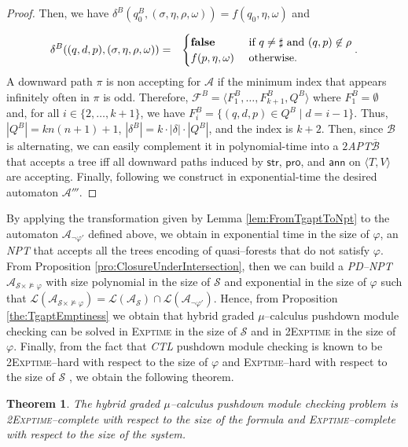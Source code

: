 \documentclass{LMCS}
\theoremstyle{plain}
\def \A             {\mathcal{A}}
\def \ann           {\ensuremath{\mathsf{ann}}\xspace}
\def \B             {\mathcal{B}}
\def \CTL           {\emph{CTL}\xspace}
\def \EXPTIME       {\textsc{Exptime}\xspace}
\def \F             {\mathcal{F}}
\def \L             {\mathcal{L}}
\def \NPT           {\emph{NPT}\xspace}
\def \PDNPT         {\emph{PD--NPT}\xspace}
\def \prom          {\ensuremath{\mathsf{pro}}\xspace}
\def \S             {\mathcal{S}}
\def \strat         {\ensuremath{\mathsf{str}}\xspace}
\def \TAPT          {\emph{$2$APT}\xspace}
\def \TWOEXPTIME    {\textsc{2Exptime}\xspace}
\newcommand \tpl[1] {\langle #1 \rangle}
\newtheorem{theorem}{Theorem}
\begin{document}
\begin{proof}
Then, we have $\delta^B(q_0^B, (\sigma, \eta, \rho, \omega)) =
f(q_0, \eta, \omega)$ and

{\small
\begin{eqnarray*}
    \delta^B((q, d, p), (\sigma, \eta, \rho, \omega)) &=& \begin{cases}
        {\bf false} & \mbox{ if } q \neq \sharp \mbox{ and } (q, p) \not\in \rho \\
        f(p, \eta, \omega) & \mbox{ otherwise.}
    \end{cases}.
\end{eqnarray*}}
\noindent A downward path $\pi$ is non accepting for $\A$ if the
minimum index that appears infinitely often in $\pi$ is odd.
Therefore, $\F^B = \tpl{F_1^B, \ldots, F_{k+1}^B, Q^B}$ where
$F_1^B = \emptyset$ and, for all $i \in \{2, \ldots, k+1\}$, we
have $F_i^B = \{(q,d,p) \in Q^B \mid d = i-1\}$. Thus,
$|Q^B|=kn(n+1)+1$, $|\delta^B| =k \cdot |\delta| \cdot |Q^B|$, and
the index is $k+2$. Then, since $\B$ is alternating, we can easily
complement it in polynomial-time into a \TAPT $\overline{\B}$ that
accepts a tree iff all downward paths induced by $\strat$,
$\prom$, and $\ann$ on $\tpl{T,V}$ are accepting. Finally,
following \cite{Var98} we construct in exponential-time the
desired automaton $\A'''$.
\end{proof}

By applying the transformation given by Lemma
\ref{lem:FromTgaptToNpt} to the automaton $\A_{\neg\varphi'}$
defined above, we obtain in exponential time in the size of
$\varphi$, an \NPT that accepts all the trees encoding of
quasi--forests that do not satisfy $\varphi$. From Proposition
\ref{pro:ClosureUnderIntersection}, then we can build a \PDNPT
$\A_{\S \times \not\models\varphi}$ with size polynomial in the
size of $\S$ and exponential in the size of $\varphi$ such that
$\L(\A_{\S \times \not\models\varphi}) = \L(\A_{\S}) \cap
\L(\A_{\neg\varphi'})$. Hence, from Proposition
\ref{the:TgaptEmptiness} we obtain that hybrid graded
$\mu$--calculus pushdown module checking can be solved in \EXPTIME
in the size of $\S$ and in \TWOEXPTIME in the size of $\varphi$.
Finally, from the fact that \CTL pushdown module checking is known
to be \TWOEXPTIME--hard with respect to the size of $\varphi$ and
\EXPTIME--hard with respect to the size of $\S$ \cite{BMP05}, we
obtain the following theorem.

\begin{theorem}\label{the:HybridGradedPushdownModuleChecking}
The hybrid graded $\mu$--calculus pushdown module checking problem
is \TWOEXPTIME--complete with respect to the size of the formula
and \EXPTIME--complete with respect to the size of the system.
\end{theorem}
\end{document}
